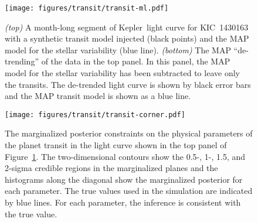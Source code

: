 \documentclass[manuscript, letterpaper]{aastex6}
\makeatletter
\let\origsubsection\subsection
\renewcommand\subsection{\@ifstar{\starsubsection}{\nostarsubsection}}
\newcommand\nostarsubsection[1]{\subsectionprelude\origsubsection{#1}}
\newcommand\starsubsection[1]{\subsectionprelude\origsubsection*{#1}}
\newcommand\subsectionprelude{\vspace{1em}}
\newcommand{\project}[1]{\textsf{#1}}
\newcommand{\kepler}{\project{Kepler}}
\newcommand{\figureref}[1]{\ref{fig:#1}}
\newcommand{\Figure}[1]{Figure~\figureref{#1}}
\newcommand{\figurelabel}[1]{\label{fig:#1}}
\makeatother
\begin{document}


\begin{figure}[!hptb]
    \begin{center}
        \texttt{[image: figures/transit/transit-ml.pdf]}
        \caption{\emph{(top)} A month-long segment of \kepler\ light curve for
            KIC~1430163 with a synthetic transit model injected (black points) and the
            MAP model for the stellar variability
            (blue line).
            \emph{(bottom)} The MAP ``de-trending'' of the data in
            the top panel.
            In this panel, the MAP model for the stellar variability
            has been subtracted to leave only the transits.
            The de-trended light curve is shown by black error bars and the MAP
            transit model is shown as a blue line.
            \figurelabel{transit-ml}}
    \end{center}
\end{figure}

\begin{figure}[!p]
    \begin{center}
        \texttt{[image: figures/transit/transit-corner.pdf]}
        \caption{The marginalized posterior constraints on the physical parameters of
            the planet transit in the light curve shown in the top panel of
            \Figure{transit-ml}.
            The two-dimensional contours show the 0.5-, 1-, 1.5, and 2-sigma credible
            regions in the marginalized planes and the histograms along the diagonal
            show the marginalized posterior for each parameter.
            The true values used in the simulation are indicated by blue lines.
            For each parameter, the inference is consistent with the true value.
            \figurelabel{transit-corner}}
    \end{center}
\end{figure}

\subsection{Summary}
\end{document}
